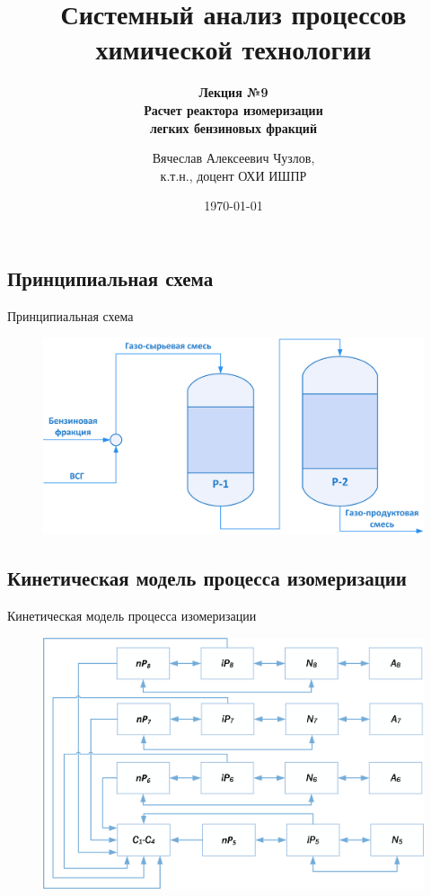\documentclass[aspectratio=169, mathserif]{beamer}%
\title{\LARGE{Системный анализ процессов химической технологии}}
\subtitle{\textcolor{tpugreen}{\textbf{Лекция №9}} \\ \textbf{Расчет реактора изомеризации \\ легких бензиновых фракций}}
\author[]{Вячеслав Алексеевич Чузлов, \\
к.т.н., доцент ОХИ ИШПР}
\date{\today}
\begin{document}
\newcommand{\pythoninline}[1]{%
	\colorbox{white}{%
		\parbox[b][.6em]{\widthof{\texttt{#1}}}{\texttt{#1}}%
	}%
}


\titleframe%



\subsection{Принципиальная схема}
\begin{frame}[fragile, label=c]{Принципиальная схема}
\scriptsize
\begin{figure}[h!]
\includegraphics[width=.8\textwidth]{./pics/pfd}
\end{figure}
\vfill
\end{frame}

\subsection{Кинетическая модель процесса изомеризации}
\begin{frame}[fragile, label=c]{Кинетическая модель процесса изомеризации}
\scriptsize
\begin{figure}[h!]
\includegraphics[width=.75\textwidth]{./pics/scheme}
\end{figure}
\vfill
\end{frame}
\end{document}

